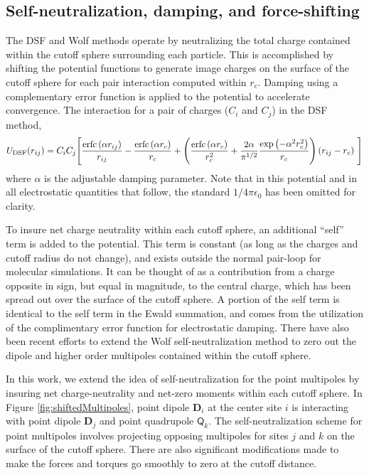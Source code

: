\subsection{Self-neutralization, damping, and force-shifting}
The DSF and Wolf methods operate by neutralizing the total charge
contained within the cutoff sphere surrounding each particle.  This is
accomplished by shifting the potential functions to generate image
charges on the surface of the cutoff sphere for each pair interaction
computed within $r_c$. Damping using a complementary error function is
applied to the potential to accelerate convergence. The interaction
for a pair of charges ($C_i$ and $C_j$) in the DSF method,
\begin{equation*}
U_\mathrm{DSF}(r_{ij}) = C_i C_j \Biggr{[}
\frac{\mathrm{erfc}\left(\alpha r_{ij}\right)}{r_{ij}} 
- \frac{\mathrm{erfc}\left(\alpha r_c\right)}{r_c} + \left(\frac{\mathrm{erfc}\left(\alpha r_c\right)}{r_c^2} 
+ \frac{2\alpha}{\pi^{1/2}}
\frac{\exp\left(-\alpha^2r_c^2\right)}{r_c}
\right)\left(r_{ij}-r_c\right)\ \Biggr{]} 
\label{eq:DSFPot}
\end{equation*}
where $\alpha$ is the adjustable damping parameter.  Note that in this
potential and in all electrostatic quantities that follow, the
standard $1/4 \pi \epsilon_{0}$ has been omitted for clarity.

To insure net charge neutrality within each cutoff sphere, an
additional ``self'' term is added to the potential. This term is
constant (as long as the charges and cutoff radius do not change), and
exists outside the normal pair-loop for molecular simulations.  It can
be thought of as a contribution from a charge opposite in sign, but
equal in magnitude, to the central charge, which has been spread out
over the surface of the cutoff sphere.  A portion of the self term is
identical to the self term in the Ewald summation, and comes from the
utilization of the complimentary error function for electrostatic
damping.\cite{deLeeuw80,Wolf99} There have also been recent efforts to
extend the Wolf self-neutralization method to zero out the dipole and
higher order multipoles contained within the cutoff
sphere.\cite{Fukuda11,Fukuda12,Fukuda13}

In this work, we extend the idea of self-neutralization for the point
multipoles by insuring net charge-neutrality and net-zero moments
within each cutoff sphere.  In Figure \ref{fig:shiftedMultipoles}, point dipole 
$\mathbf{D}_i$ at the center site $i$ is interacting with point dipole
$\mathbf{D}_j$ and point quadrupole  $\mathsf{Q}_k$.  The
self-neutralization scheme for point multipoles involves projecting
opposing multipoles for sites $j$ and $k$ on the surface of the cutoff
sphere.  There are also significant modifications made to make the
forces and torques go smoothly to zero at the cutoff distance.

